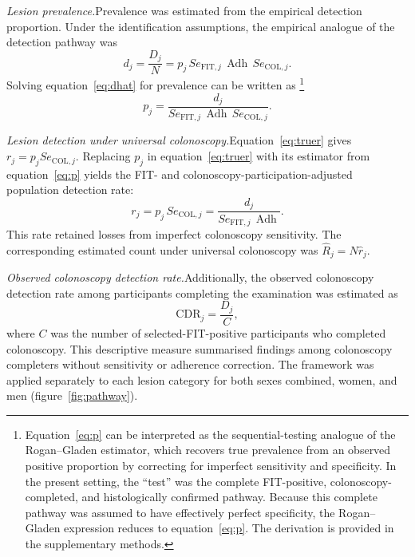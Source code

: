\documentclass[10pt,a4paper]{article}
\newcommand{\Se}{\mathit{Se}}
\newcommand{\Adh}{\operatorname{Adh}}
\begin{document}
\textit{Lesion prevalence.}\quad Prevalence was estimated from the empirical detection proportion. Under the identification assumptions, the empirical analogue of the detection pathway was
\begin{equation}
d_j=\frac{ D_j}{N}
= p_j\,\Se_{\mathrm{FIT},j}\,\Adh\,\Se_{\mathrm{COL},j}.
\label{eq:dhat}
\end{equation}
Solving equation~\eqref{eq:dhat} for prevalence can be written as \footnote{Equation~\eqref{eq:p} can be interpreted as the sequential-testing analogue of the Rogan--Gladen estimator, which recovers true prevalence from an observed positive proportion by correcting for imperfect sensitivity and specificity.\cite{RoganGladen1978} In the present setting, the ``test'' was the complete FIT-positive, colonoscopy-completed, and histologically confirmed pathway. Because this complete pathway was assumed to have effectively perfect specificity, the Rogan--Gladen expression reduces to equation~\eqref{eq:p}. The derivation is provided in the supplementary methods.
}
\begin{equation}
 p_j=\frac{ d_j}{\Se_{\mathrm{FIT},j}\,\Adh\,\Se_{\mathrm{COL},j}}.
\label{eq:p}
\end{equation}




\textit{Lesion detection under universal colonoscopy.}\quad Equation~\eqref{eq:truer} gives $r_j=p_j\Se_{\mathrm{COL},j}$. Replacing $p_j$ in equation~\eqref{eq:truer} with its estimator from equation~\eqref{eq:p} yields the FIT- and colonoscopy-participation-adjusted population detection rate:
\begin{equation*}
r_j= p_j\,\Se_{\mathrm{COL},j}
=\frac{ d_j}{\Se_{\mathrm{FIT},j}\,\Adh}.
\end{equation*}
This rate retained losses from imperfect colonoscopy sensitivity. The corresponding estimated count under universal colonoscopy was $\widehat R_j=N\widehat r_j$.

\textit{Observed colonoscopy detection rate.}\quad Additionally, the observed colonoscopy detection rate among participants completing the examination was estimated as
\begin{equation*}
\mathrm{CDR}_j=\frac{D_j}{C},
\end{equation*}
where $C$ was the number of selected-FIT-positive participants who completed colonoscopy. This descriptive measure summarised findings among colonoscopy completers without sensitivity or adherence correction. The framework was applied separately to each lesion category for both sexes combined, women, and men (figure~\ref{fig:pathway}).
\end{document}
